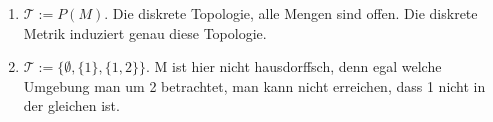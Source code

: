 \documentclass[ngerman]{report}
\theoremstyle{plain}%
\theoremstyle{definition}%
\theoremstyle{myStyle}
\newcommand{\tT}{\mathcal{T}} %
\begin{document}
\begin{enumerate}
\begin{enumerate}[]
\item $\tT:=P(M)$. Die diskrete Topologie, alle Mengen sind offen. Die diskrete Metrik induziert genau diese Topologie.

\item $\tT:=\{\emptyset,\{1\},\{1,2\}\}.$ M ist hier nicht hausdorffsch, denn egal welche Umgebung man um 2 betrachtet, man kann nicht erreichen, dass 1 nicht in der gleichen ist.
\end{enumerate}
			
	\end{enumerate} 
 
\end{document}
